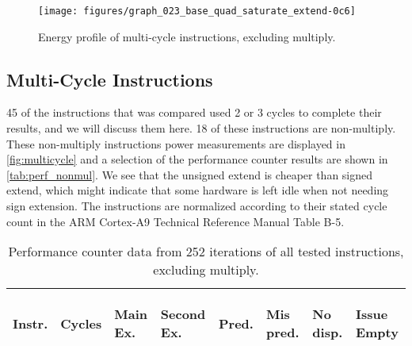 \begin{figure}
    \centering
    \texttt{[image: figures/graph\_023\_base\_quad\_saturate\_extend-0c6]}
    \caption{Energy profile of multi-cycle instructions, excluding multiply.}
    \label{fig:multicycle}
\end{figure}


\subsection{Multi-Cycle Instructions}


45 of the instructions that was compared used 2 or 3 cycles to complete their
results, and we will discuss them here. 18 of these instructions are
non-multiply.  These non-multiply instructions power measurements are displayed
in \autoref{fig:multicycle} and a selection of the performance counter results
are shown in \autoref{tab:perf_nonmul}. We see that the unsigned extend is
cheaper than signed extend, which might indicate that some hardware is left idle
when not needing sign extension. The instructions are normalized according to
their stated cycle count in the ARM Cortex-A9 Technical Reference Manual Table
B-5\cite{armtech}.

\begin{table}
    \centering
    \begin{tabular}{|p{0.7cm}|R{0.8cm}R{0.6cm}R{0.85cm}R{0.6cm}R{0.45cm}R{0.75cm}R{0.72cm}|}
        \hline
        \centering
        Instr. &
        \centering
        Cycles &
        \centering
        Main Ex. &
        \centering
        Second Ex. &
        \centering
        Pred.&
        \centering
        Mis pred.&
        \centering
        No disp. &
        \begin{centering}
        Issue Empty
        \end{centering}
        \\
        \hline
        
        \hline
    \end{tabular}
    \caption{Performance counter data from 252 iterations of all tested
    instructions, excluding multiply.}
    \label{tab:perf_nonmul}
    \hfill
\end{table}




